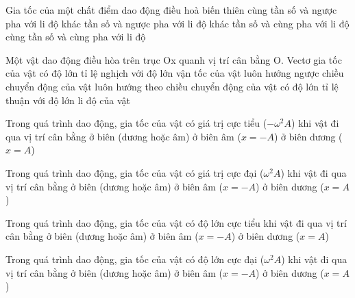 \begin{ex}%
Gia tốc của một chất điểm dao động điều hoà biến thiên
\choice
{\True cùng tần số và ngược pha với li độ}
{khác tần số và ngược pha với li độ}
{khác tần số và cùng pha với li độ}
{cùng tần số và cùng pha với li độ}
\end{ex} 
\begin{ex}%
Một vật dao động điều hòa trên trục Ox quanh vị trí cân bằng O. Vectơ gia tốc của vật
\choice
{có độ lớn tỉ lệ nghịch với độ lớn vận tốc của vật}
{luôn hướng ngược chiều chuyển động của vật}
{luôn hướng theo chiều chuyển động của vật}
{\True có độ lớn tỉ lệ thuận với độ lớn li độ của vật}
\end{ex} 
\begin{ex}%
Trong quá trình dao động, gia tốc của vật có giá trị cực tiểu ($- \omega^2A$) khi vật
\choice
{đi qua vị trí cân bằng}
{ở biên (dương hoặc âm)}
{ở biên âm ($x = - A$)}
{\True ở biên dương ($x = A$)}
\end{ex} 
\begin{ex}%
Trong quá trình dao động, gia tốc của vật có giá trị cực đại ($\omega^2A$) khi vật
\choice
{đi qua vị trí cân bằng}
{ở biên (dương hoặc âm)}
{\True ở biên âm ($x = - A$)}
{ở biên dương ($x = A$)}

\end{ex} \begin{ex}%
Trong quá trình dao động, gia tốc của vật có độ lớn cực tiểu khi vật
\choice
{\True đi qua vị trí cân bằng}
{ở biên (dương hoặc âm)}
{ở biên âm ($x = - A$)}
{ở biên dương ($x = A$)}
\end{ex} 
\begin{ex}%
Trong quá trình dao động, gia tốc của vật có độ lớn cực đại ($\omega^2A$) khi vật
\choice
{đi qua vị trí cân bằng}
{\True ở biên (dương hoặc âm)}
{ở biên âm ($x = - A$)}
{ở biên dương ($x = A$)}
\end{ex} 








